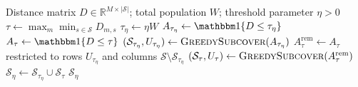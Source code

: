 \begin{algorithm}[!htbp]
\caption{Two-stage greedy subcover with parameter $\eta$}
\label{alg:eta_greedy_subcover}
\begin{algorithmic}[1]
\Require Distance matrix $D\in\mathbb{R}^{M\times|\mathcal{S}|}$; total population $W$; threshold parameter $\eta>0$
\State $\tau \gets\max_m \min_{s\in\mathcal{S}}D_{m,s}$
\State $\tau_\eta \gets \eta W$
\State $A_{\tau_\eta}\gets\ind\{D\leq\tau_\eta\}$
\State $A_\tau\gets\ind\{D\leq\tau\}$
\State $(\mathcal{S}_{\tau_\eta},U_{\tau_\eta}) \gets \Call{GreedySubcover}{A_{\tau_\eta}}$
\State $A_\tau^{\mathrm{rem}}\gets A_\tau$ restricted to rows $U_{\tau_\eta}$ and columns $\mathcal{S}\setminus\mathcal{S}_{\tau_\eta}$
\State $(\mathcal{S}_\tau,U_\tau) \gets \Call{GreedySubcover}{A_\tau^{\mathrm{rem}}}$
\State $\mathcal{S}_\eta \gets \mathcal{S}_{\tau_\eta}\cup\mathcal{S}_\tau$
\State \Return $\mathcal{S}_\eta$
\end{algorithmic}
\end{algorithm}
